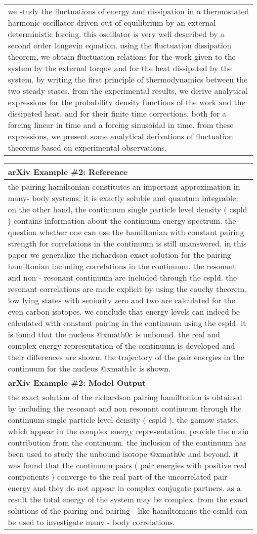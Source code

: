 \documentclass{article} \usepackage{iclr2022_conference,times}
\begin{document}
\begin{table}[!htbp]
\begin{tabular}{p{\linewidth}}
we study the fluctuations of energy and dissipation in a thermostated harmonic oscillator driven out of equilibrium by an external deterministic forcing. this oscillator is very well described by a second order langevin equation. using the fluctuation dissipation theorem, we obtain fluctuation relations for the work given to the system by the external torque and for the heat dissipated by the system, by writing the first principle of thermodynamics between the two steady states. from the experimental results, we derive analytical expressions for the probability density functions of the work and the dissipated heat, and for their finite time corrections, both for a forcing linear in time and a forcing sinusoidal in time. from these expressions, we present some analytical derivations of fluctuation theorems based on experimental observations.
    \\
    \end{tabular}
    \begin{tabular}{p{\linewidth}} 
    \midrule
    \textbf{arXiv Example \#2: Reference} \\
    \midrule
the pairing hamiltonian constitutes an important approximation in many- body systems, it is exactly soluble and quantum integrable. on the other hand, the continuum single particle level density ( cspld ) contains information about the continuum energy spectrum. the question whether one can use the hamiltonian with constant pairing strength for correlations in the continuum is still unanswered. in this paper we generalize the richardson exact solution for the pairing hamiltonian including correlations in the continuum. the resonant and non - resonant continuum are included through the cspld. the resonant correlations are made explicit by using the cauchy theorem. low lying states with seniority zero and two are calculated for the even carbon isotopes. we conclude that energy levels can indeed be calculated with constant pairing in the continuum using the cspld. it is found that the nucleus @xmath0c is unbound. the real and complex energy representation of the continuum is developed and their differences are shown. the trajectory of the pair energies in the continuum for the nucleus @xmath1c is shown.
    \\
    \midrule
    \textbf{arXiv Example \#2: Model Output} \\
    \midrule
the exact solution of the richardson pairing hamiltonian is obtained by including the resonant and non resonant continuum through the continuum single particle level density ( cspld ). the gamow states, which appear in the complex energy representation, provide the main contribution from the continuum. the inclusion of the continuum has been used to study the unbound isotope @xmath0c and beyond. it was found that the continuum pairs ( pair energies with positive real components ) converge to the real part of the uncorrelated pair energy and they do not appear in complex conjugate partners. as a result the total energy of the system may be complex. from the exact solutions of the pairing and pairing - like hamiltonians the csmld can be used to investigate many - body correlations.

\end{tabular}
\end{table}
\end{document}
